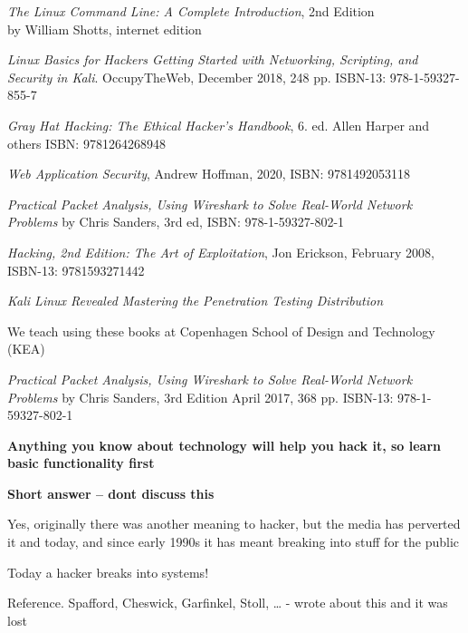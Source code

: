 \documentclass[Screen16to9,17pt]{foils}
\begin{document}
\begin{list2}
\item \emph{The Linux Command Line: A Complete Introduction}, 2nd Edition\\
 by William Shotts, internet edition 
\item \emph{Linux Basics for Hackers Getting Started with Networking, Scripting, and Security in Kali}. OccupyTheWeb, December 2018, 248 pp. ISBN-13: 978-1-59327-855-7
\item \emph{Gray Hat Hacking: The Ethical Hacker's Handbook}, 6. ed. Allen Harper and others ISBN: 9781264268948
\item \emph{Web Application Security}, Andrew Hoffman, 2020, ISBN: 9781492053118
\item \emph{Practical Packet Analysis, Using Wireshark to Solve Real-World Network Problems}
by Chris Sanders, 3rd ed, ISBN: 978-1-59327-802-1
\item \emph{Hacking, 2nd Edition: The Art of Exploitation}, Jon Erickson, February 2008, ISBN-13: 9781593271442
\item \emph{Kali Linux Revealed Mastering the Penetration Testing Distribution}\\
\end{list2}


We teach using these books at Copenhagen School of Design and Technology (KEA)



\emph{Practical Packet Analysis,
Using Wireshark to Solve Real-World Network Problems}
by Chris Sanders, 3rd Edition
April 2017, 368 pp.
ISBN-13:
978-1-59327-802-1

{\bf Anything you know about technology will help you hack it, so learn basic functionality first}



{\bfseries Short answer -- dont discuss this}

Yes, originally there was another meaning to hacker, but the media has perverted it and today, and since early 1990s it has meant breaking into stuff for the public

{\color{red}\hlkbig Today a hacker breaks into systems!}

Reference. Spafford, Cheswick, Garfinkel, Stoll, \ldots
- wrote about this and it was lost
\end{document}
